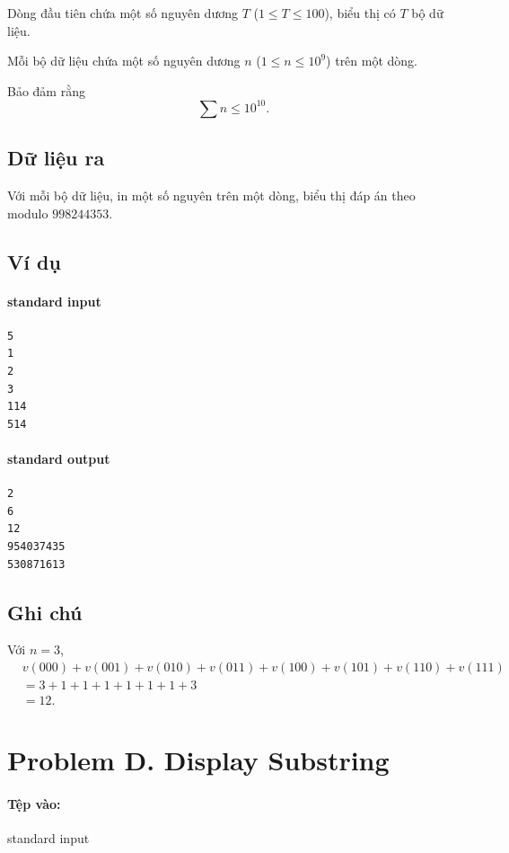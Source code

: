 \documentclass[11pt]{article}
\begin{document}
Dòng đầu tiên chứa một số nguyên dương \(T\) (\(1\le T\le 100\)), biểu thị có
\(T\) bộ dữ liệu.

Mỗi bộ dữ liệu chứa một số nguyên dương \(n\) (\(1\le n\le 10^9\)) trên một
dòng.

Bảo đảm rằng
\[
  \sum n\le 10^{10}.
\]

\subsection*{Dữ liệu ra}

Với mỗi bộ dữ liệu, in một số nguyên trên một dòng, biểu thị đáp án theo
modulo \(998244353\).

\subsection*{Ví dụ}

\paragraph{standard input}
\begin{verbatim}
5
1
2
3
114
514
\end{verbatim}

\paragraph{standard output}
\begin{verbatim}
2
6
12
954037435
530871613
\end{verbatim}

\subsection*{Ghi chú}

Với \(n=3\),
\[
\begin{aligned}
 &v(000)+v(001)+v(010)+v(011)+v(100)+v(101)+v(110)+v(111)\\
 &=3+1+1+1+1+1+1+3\\
 &=12.
\end{aligned}
\]

\section{Problem D. Display Substring}

\paragraph{Tệp vào:} standard input
\end{document}
